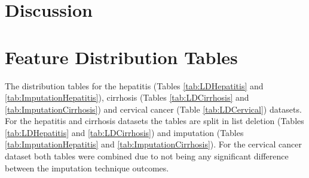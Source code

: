 \documentclass[10pt,a4paper]{article}
\begin{document}
	\section{Discussion}
	\label{sec:Discussion}
	
	 
	
	
	\appendix
	
	\section{Feature Distribution Tables}

	\label{app:DistributionTables}
	
	The distribution tables for the hepatitis (Tables \ref{tab:LDHepatitis} and \ref{tab:ImputationHepatitis}), cirrhosis (Tables \ref{tab:LDCirrhosis} and \ref{tab:ImputationCirrhosis}) and cervical cancer (Table \ref{tab:LDCervical}) datasets. For the hepatitis and cirrhosis datasets the tables are split in list deletion (Tables \ref{tab:LDHepatitis} and \ref{tab:LDCirrhosis}) and imputation (Tables \ref{tab:ImputationHepatitis} and \ref{tab:ImputationCirrhosis}). For the cervical cancer dataset both tables were combined due to not being any significant difference between the imputation technique outcomes. 
	
\end{document}
